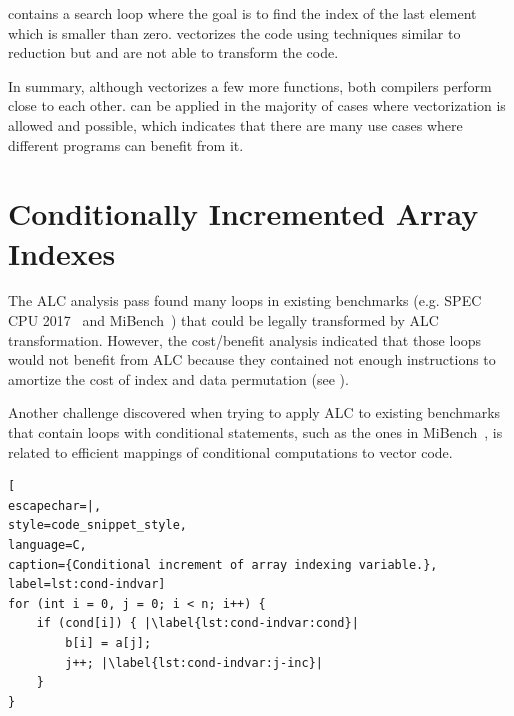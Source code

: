  contains a search loop where the goal is to find the index of the last element which is smaller than zero. \gcc vectorizes the code using techniques similar to reduction but \armclang and \ALC are not able to transform the code.

In summary, although \gcc vectorizes a few more functions, both compilers perform close to each other. \ALC can be applied in the majority of cases where vectorization is allowed and possible, which indicates that there are many use cases where different programs can benefit from it. 

\section{Conditionally Incremented Array Indexes}
\label{sec:eval-limitations}

The ALC analysis pass found many loops in existing benchmarks (e.g. SPEC CPU 2017~\cite{spec} and MiBench~\cite{MiBench}) that could be legally transformed by ALC transformation.
However, the cost/benefit analysis indicated that those loops would not benefit from ALC because they contained not enough instructions to amortize the cost of index and data permutation (see ).



Another challenge discovered when trying to apply ALC to existing benchmarks that contain loops with conditional statements, such as the ones in MiBench~\cite{MiBench}, is related to efficient mappings of conditional computations to vector code. 


\begin{center}
\begin{minipage}[t]{0.99\columnwidth}
\begin{lstlisting}[
escapechar=|,
style=code_snippet_style,
language=C,
caption={Conditional increment of array indexing variable.},
label=lst:cond-indvar]
for (int i = 0, j = 0; i < n; i++) {
    if (cond[i]) { |\label{lst:cond-indvar:cond}|
        b[i] = a[j];
        j++; |\label{lst:cond-indvar:j-inc}|
    }
}
\end{lstlisting} 
\end{minipage}
\end{center}

